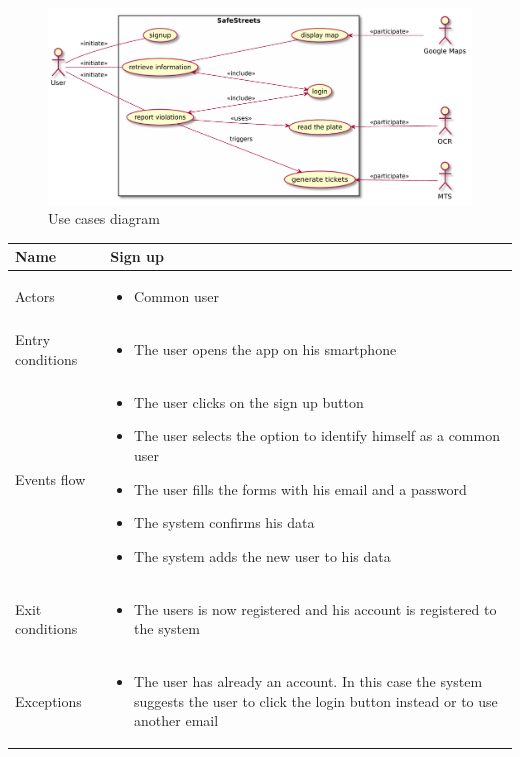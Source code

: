 \documentclass[a4paper]{article}
\begin{document}
\begin{figure}[H]
\centering
\includegraphics[width=\textwidth]{usecase_common_user.pdf}
\caption{Use cases diagram}
\end{figure}

\begin{table}[H]
\centering
\begin{tabularx}{\textwidth}{|l|X|}
\hline
Name & Sign up\tabularnewline
\hline
Actors &
\begin{itemize}[nosep,leftmargin=*]
\item Common user
\end{itemize}
\tabularnewline
\hline
Entry conditions &
\begin{itemize}[nosep,leftmargin=*]
\item The user opens the app on his smartphone
\end{itemize}
\tabularnewline
\hline
Events flow &
\begin{itemize}[nosep,leftmargin=*]
\item The user clicks on the sign up button
\item The user selects the option to identify himself as a common user
\item The user fills the forms with his email and a password
\item The system confirms his data
\item The system adds the new user to his data
\end{itemize}
\tabularnewline
\hline
Exit conditions &
\begin{itemize}[nosep,leftmargin=*]
\item The users is now registered and his account is registered to the
system
\end{itemize}
\tabularnewline
\hline
Exceptions &
\begin{itemize}[nosep,leftmargin=*]
\item The user has already an account. In this case the system suggests
the user to click the login button instead or to use another email
\end{itemize}
\tabularnewline
\hline
\end{tabularx}
\end{table}
\end{document}
